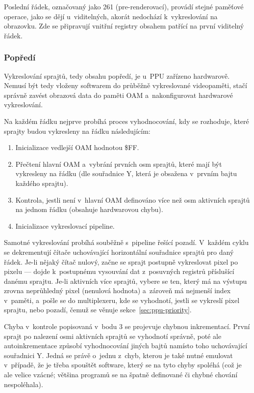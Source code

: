 Poslední řádek, označovaný jako 261 (pre-renderovací), provádí stejné paměťové operace, jako se dějí u~viditelných, akorát nedochází k~vykreslování na obrazovku. Zde se připravují vnitřní registry obsahem patřící na první viditelný řádek.

\subsubsection{Popředí}
Vykreslování sprajtů, tedy obsahu popředí, je u~PPU zařízeno hardwarově. Nemusí být tedy vloženy softwarem do průběžně vykreslované videopaměti, stačí správně zavést obrazová data do paměti OAM a~nakonfigurovat hardwarové vykreslování.

Na každém řádku nejprve probíhá proces vyhodnocování, kdy se rozhoduje, které sprajty budou vykresleny na řádku následujícím:
\begin{enumerate}
	\item Inicializace vedlejší OAM hodnotou \$FF.
	\item Přečtení hlavní OAM a~vybrání prvních osm sprajtů, které mají být vykresleny na řádku (dle souřadnice Y, která je obsažena v~prvním bajtu každého sprajtu).
	\item Kontrola, jestli není v~hlavní OAM definováno více než osm aktivních sprajtů na jednom řádku (obsahuje hardwarovou chybu).
	\item Inicializace vykreslovací pipeline.
\end{enumerate}

Samotné vykreslování probíhá souběžně s~pipeline řešící pozadí. V~každém cyklu se dekrementují čítače uchovávající horizontální souřadnice sprajtů pro daný řádek. Je-li nějaký čítač nulový, začne se sprajt postupně vykreslovat pixel po pixelu --- dojde k~postupnému vysouvání dat z~posuvných registrů příslušící danému sprajtu. Je-li aktivních více sprajtů, vybere se ten, který má na výstupu zrovna neprůhledný pixel (nenulová hodnota) a~zároveň má nejmenší index v~paměti, a~pošle se do multiplexeru, kde se vyhodnotí, jestli se vykreslí pixel sprajtu, nebo pozadí, čemuž se věnuje sekce~\ref{sec:ppu-priority}.

\begin{note}
Chyba v~kontrole popisovaná v~bodu 3 se projevuje chybnou inkrementací. První sprajt po nalezení osmi aktivních sprajtů se vyhodnotí správně, poté ale autoinkrementace způsobí vyhodnocování jiných bajtů namísto toho uchovávající souřadnici Y. Jedná se právě o~jednu z~chyb, kterou je také nutné emulovat v~případě, že je třeba spouštět software, který se na tyto chyby spoléhá (což je ale velice vzácné; většina programů se na špatně definované či chybné chování nespoléhala).
\end{note}

